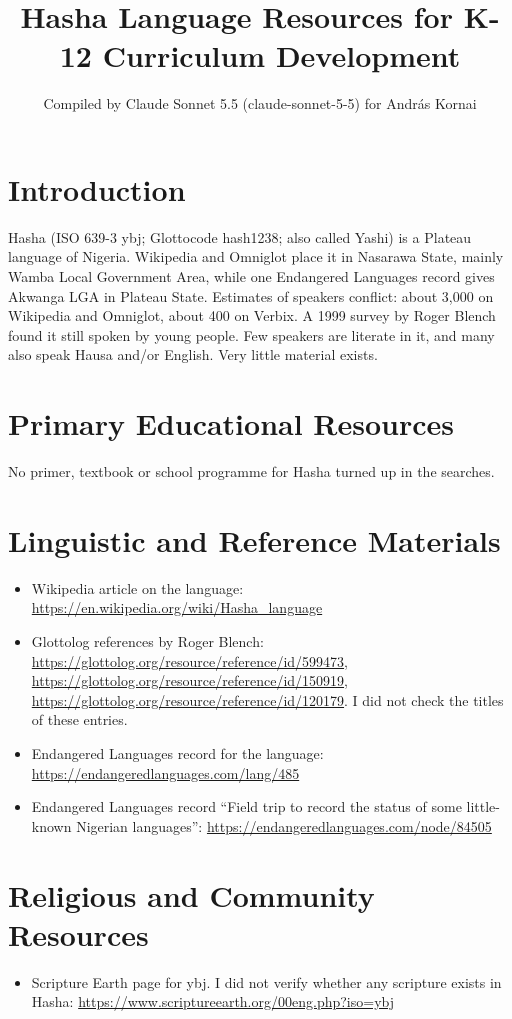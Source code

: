 \documentclass[12pt]{article}
\title{Hasha Language Resources for K-12 Curriculum Development}
\author{Compiled by Claude Sonnet 5.5 (claude-sonnet-5-5) for Andr\'as Kornai}
\date{}
\begin{document}
\maketitle

\section{Introduction}
Hasha (ISO 639-3 ybj; Glottocode hash1238; also called Yashi) is a Plateau language of Nigeria. Wikipedia and Omniglot place it in Nasarawa State, mainly Wamba Local Government Area, while one Endangered Languages record gives Akwanga LGA in Plateau State. Estimates of speakers conflict: about 3,000 on Wikipedia and Omniglot, about 400 on Verbix. A 1999 survey by Roger Blench found it still spoken by young people. Few speakers are literate in it, and many also speak Hausa and/or English. Very little material exists.

\section{Primary Educational Resources}
No primer, textbook or school programme for Hasha turned up in the searches.

\section{Linguistic and Reference Materials}
\begin{itemize}
\item Wikipedia article on the language: \url{https://en.wikipedia.org/wiki/Hasha_language}
\item Glottolog references by Roger Blench: \url{https://glottolog.org/resource/reference/id/599473}, \url{https://glottolog.org/resource/reference/id/150919}, \url{https://glottolog.org/resource/reference/id/120179}. I did not check the titles of these entries.
\item Endangered Languages record for the language: \url{https://endangeredlanguages.com/lang/485}
\item Endangered Languages record ``Field trip to record the status of some little-known Nigerian languages'': \url{https://endangeredlanguages.com/node/84505}
\end{itemize}

\section{Religious and Community Resources}
\begin{itemize}
\item Scripture Earth page for ybj. I did not verify whether any scripture exists in Hasha: \url{https://www.scriptureearth.org/00eng.php?iso=ybj}
\end{itemize}
\end{document}
